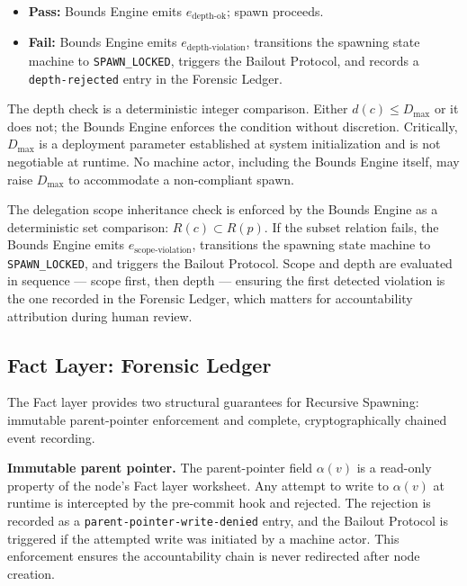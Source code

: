 \begin{itemize}
  \item \textbf{Pass:} Bounds Engine emits $e_{\text{depth-ok}}$; spawn
    proceeds.
  \item \textbf{Fail:} Bounds Engine emits $e_{\text{depth-violation}}$,
    transitions the spawning state machine to \texttt{SPAWN\_LOCKED}, triggers
    the Bailout Protocol, and records a \texttt{depth-rejected} entry in the
    Forensic Ledger.
\end{itemize}

The depth check is a deterministic integer comparison.  Either $d(c) \leq
D_{\max}$ or it does not; the Bounds Engine enforces the condition without
discretion.  Critically, $D_{\max}$ is a deployment parameter established at
system initialization and is not negotiable at runtime.  No machine actor,
including the Bounds Engine itself, may raise $D_{\max}$ to accommodate a
non-compliant spawn.

The delegation scope inheritance check is enforced by the Bounds Engine as a
deterministic set comparison: $R(c) \subset R(p)$.  If the subset relation
fails, the Bounds Engine emits $e_{\text{scope-violation}}$, transitions the
spawning state machine to \texttt{SPAWN\_LOCKED}, and triggers the Bailout
Protocol.  Scope and depth are evaluated in sequence --- scope first, then
depth --- ensuring the first detected violation is the one recorded in the
Forensic Ledger, which matters for accountability attribution during human
review.

\subsection{Fact Layer: Forensic Ledger}
\label{sec:rs-fact-fledger}

The Fact layer provides two structural guarantees for Recursive Spawning:
immutable parent-pointer enforcement and complete, cryptographically chained
event recording.

\medskip\noindent\textbf{Immutable parent pointer.}  The parent-pointer field
$\alpha(v)$ is a read-only property of the node's Fact layer worksheet.  Any
attempt to write to $\alpha(v)$ at runtime is intercepted by the pre-commit hook
and rejected.  The rejection is recorded as a \texttt{parent-pointer-write-denied}
entry, and the Bailout Protocol is triggered if the attempted write was
initiated by a machine actor.  This enforcement ensures the accountability chain
is never redirected after node creation.

